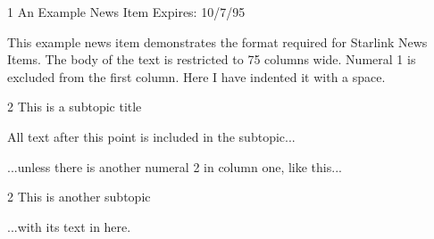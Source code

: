 \documentclass[11pt,nolof,noabs]{starlink}
\begin{document}
\begin{small}
\begin{terminalv}

1 An Example News Item
                                                         Expires: 10/7/95

This example news item demonstrates the format required for Starlink News
Items. The body of the text is restricted to 75 columns wide.  Numeral
 1 is excluded from the first column. Here I have indented it with a space.

2 This is a subtopic title

All text after this point is included in the subtopic...

...unless there is another numeral 2 in column one, like this...

2 This is another subtopic

...with its text in here.

\end{terminalv}
\end{small}
\end{document}
